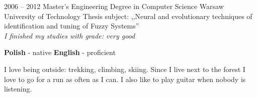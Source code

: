 \documentclass[8pt]{developercv} %
\begin{document}


\begin{entrylist}
	\entry
		{2006 -- 2012}
		{Master's Engineering Degree in Computer Science}
		{Warsaw University of Technology}
		{Thesis subject: ,,Neural and evolutionary techniques of identification and tuning of Fuzzy Systems'' \\ \textit{I finished my studies with grade: very good}}
\end{entrylist}


\begin{minipage}[t]{0.3\textwidth}
	\vspace{-\baselineskip} %

	
	\textbf{Polish} - native \hspace{0.2cm} \textbf{English} - proficient
\end{minipage}
\hfill
\begin{minipage}[t]{0.7\textwidth}
	\vspace{-\baselineskip} %
	
	
	I love being outside: trekking, climbing, skiing. Since I live next to the forest I love to go for a run as often as I can. I also like to play guitar when nobody is listening.
\end{minipage}
\end{document}
